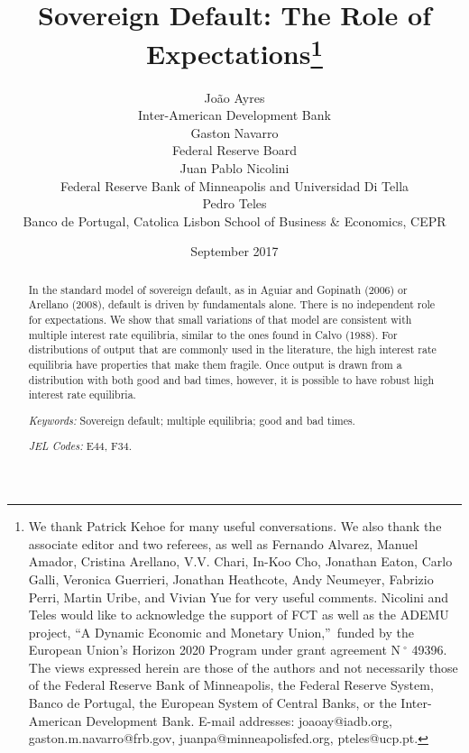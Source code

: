 \documentclass[english,12pt,a4paper]{article}
\begin{document}
\title{\textbf{Sovereign Default: The Role of Expectations}\thanks{
We thank Patrick Kehoe for many useful conversations. We also thank the
associate editor and two referees, as well as Fernando Alvarez, Manuel
Amador, Cristina Arellano, V.V. Chari, In-Koo Cho, Jonathan Eaton, Carlo
Galli, Veronica Guerrieri, Jonathan Heathcote, Andy Neumeyer, Fabrizio
Perri, Martin Uribe, and Vivian Yue for very useful comments. Nicolini and
Teles would like to acknowledge the support of FCT as well as the ADEMU
project, \textquotedblleft A Dynamic Economic and Monetary
Union,\textquotedblright\ funded by the European Union's Horizon 2020
Program under grant agreement N${\ {}^{\circ }}$ 49396. The views expressed
herein are those of the authors and not necessarily those of the Federal
Reserve Bank of Minneapolis, the Federal Reserve System, Banco de Portugal,
the European System of Central Banks, or the Inter-American Development
Bank. E-mail addresses: joaoay@iadb.org, gaston.m.navarro@frb.gov,
juanpa@minneapolisfed.org, pteles@ucp.pt.}}
\author{Jo\~{a}o Ayres \\
{\normalsize {Inter-American Development Bank}}\\
[1ex] Gaston Navarro \\
[-0.3ex] {\normalsize {Federal Reserve Board} }\\
[1ex] Juan Pablo Nicolini \\
[-0.3ex] {\normalsize {Federal Reserve Bank of Minneapolis and Universidad
Di Tella} }\\
[1ex] Pedro Teles \\
[-0.3ex] {\normalsize {Banco de Portugal, Catolica Lisbon School of Business
\& Economics, CEPR}}}
\date{September 2017}
\maketitle

\begin{abstract}
In the standard model of sovereign default, as in Aguiar and Gopinath (2006)
or Arellano (2008), default is driven by fundamentals alone. There is no
independent role for expectations. We show that small variations of that
model are consistent with multiple interest rate equilibria, similar to the
ones found in Calvo (1988). For distributions of output that are commonly
used in the literature, the high interest rate equilibria have properties
that make them fragile. Once output is drawn from a distribution with both
good and bad times, however, it is possible to have robust high interest
rate equilibria. \smallskip

\noindent \textit{Keywords: } Sovereign default; multiple equilibria; good
and bad times.

\noindent \textit{JEL Codes: }E44, F34.

\medskip \bigskip
\end{abstract}
\end{document}
